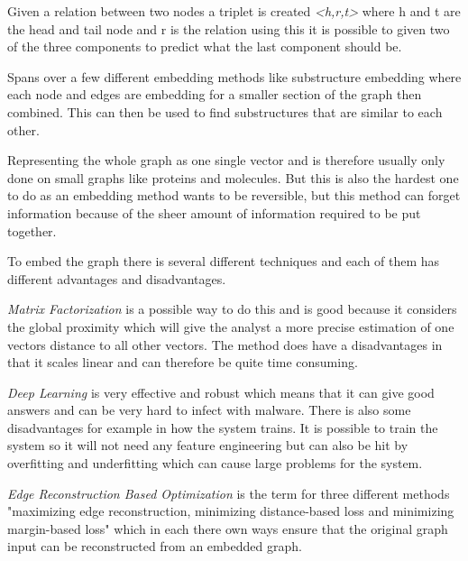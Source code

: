 \begin{definition} Given a relation between two nodes a triplet is created \textit{<h,r,t>}  where h and t are the head and tail node and r is the relation using this it is possible to given two of the three components to predict what the last component should be.
\end{definition}

\begin{definition} Spans over a few different embedding methods like substructure embedding where each node and edges are embedding for a smaller section of the graph then combined. This can then be used to find substructures that are similar to each other.
\end{definition}

\begin{definition} Representing the whole graph as one single vector and is therefore usually only done on small graphs like proteins and molecules. But this is also the hardest one to do as an embedding method wants to be reversible, but this method can forget information because of the sheer amount of information required to be put together.
\end{definition}

To embed the graph there is several different techniques and each of them has different advantages and disadvantages.

\textit{Matrix Factorization} is a possible way to do this and is good because it considers the global proximity which will give the analyst a more precise estimation of one vectors distance to all other vectors. The method does have a disadvantages in that it scales linear and can therefore be quite time consuming.

\textit{Deep Learning} is very effective and robust which means that it can give good answers and can be very hard to infect with malware. There is also some disadvantages for example in how the system trains. It is possible to train the system so it will not need any feature engineering but can also be hit by overfitting and underfitting which can cause large problems for the system.

\textit{Edge Reconstruction Based Optimization} is the term for three different methods "maximizing edge reconstruction, minimizing distance-based loss and minimizing margin-based loss" which in each there own ways ensure that the original graph input can be reconstructed from an embedded graph.

